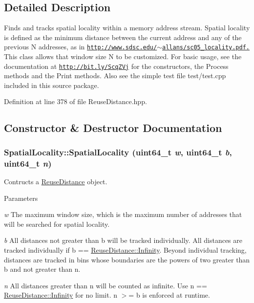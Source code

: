 \subsection{Detailed Description}
Finds and tracks spatial locality within a memory address stream. Spatial locality is defined as the minimum distance between the current address and any of the previous N addresses, as in \href{http://www.sdsc.edu/~allans/sc05_locality.pdf.}{\tt http://www.sdsc.edu/$\sim$allans/sc05\_\-locality.pdf.} This class allows that window size N to be customized. For basic usage, see the documentation at \href{http://bit.ly/ScqZVj}{\tt http://bit.ly/ScqZVj} for the constructors, the Process methods and the Print methods. Also see the simple test file test/test.cpp included in this source package. 

Definition at line 378 of file ReuseDistance.hpp.



\subsection{Constructor \& Destructor Documentation}
\hypertarget{class_spatial_locality_aff3106d38ff5ba3e6ecaec0c7214eaea}{
\subsubsection[{SpatialLocality}]{\setlength{\rightskip}{0pt plus 5cm}SpatialLocality::SpatialLocality (uint64\_\-t {\em w}, \/  uint64\_\-t {\em b}, \/  uint64\_\-t {\em n})}}
\label{class_spatial_locality_aff3106d38ff5ba3e6ecaec0c7214eaea}
Contructs a \hyperlink{class_reuse_distance}{ReuseDistance} object.


\begin{DoxyParams}{Parameters}
\item[{\em w}]The maximum window size, which is the maximum number of addresses that will be searched for spatial locality. \item[{\em b}]All distances not greater than b will be tracked individually. All distances are tracked individually if b == \hyperlink{class_reuse_distance_a59f7f0ac6ad014472537619394ac7375}{ReuseDistance::Infinity}. Beyond individual tracking, distances are tracked in bins whose boundaries are the powers of two greater than b and not greater than n. \item[{\em n}]All distances greater than n will be counted as infinite. Use n == \hyperlink{class_reuse_distance_a59f7f0ac6ad014472537619394ac7375}{ReuseDistance::Infinity} for no limit. n $>$= b is enforced at runtime. \end{DoxyParams}


